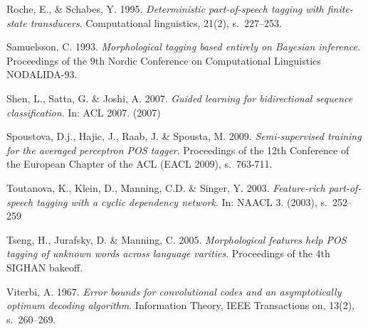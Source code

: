 \documentclass[utf8,bachelor,manualbib]{gradu3}
\begin{document}
\begin{thebibliography}{}
Roche, E., \& Schabes, Y. 1995. \textit{Deterministic part-of-speech tagging with finite-state transducers}. Computational linguistics, 21(2), s.~227--253.

Samuelsson, C. 1993. \textit{Morphological tagging based entirely on Bayesian inference}. Proceedings of the 9th Nordic Conference on Computational Linguistics NODALIDA-93.

Shen, L., Satta, G. \& Joshi, A. 2007. \textit{Guided learning for bidirectional sequence classification}. In: ACL 2007. (2007)

Spoustova, D.j., Hajic, J., Raab, J. \& Spousta, M. 2009. \textit{Semi-supervised training for the averaged perceptron POS tagger}. Proceedings of the 12th Conference of the
European Chapter of the ACL (EACL 2009), s.~763-711.

Toutanova, K., Klein, D., Manning, C.D. \& Singer, Y. 2003. \textit{Feature-rich part-of-speech tagging with a cyclic dependency network}. In: NAACL 3. (2003), s.~252--259

Tseng, H., Jurafsky, D. \& Manning, C. 2005. \textit{Morphological features help POS tagging of unknown words across language varities}. Proceedings of the 4th SIGHAN bakeoff.

Viterbi, A. 1967. \textit{Error bounds for convolutional codes and an asymptotically optimum decoding algorithm}. Information Theory, IEEE Transactions on, 13(2), s.~260--269.

\end{thebibliography}
\end{document}
